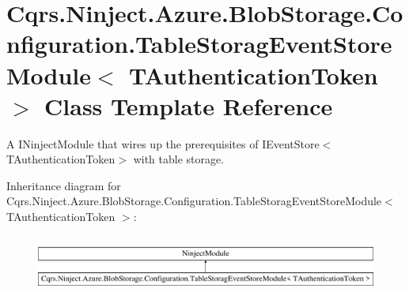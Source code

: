 \hypertarget{classCqrs_1_1Ninject_1_1Azure_1_1BlobStorage_1_1Configuration_1_1TableStoragEventStoreModule}{}\section{Cqrs.\+Ninject.\+Azure.\+Blob\+Storage.\+Configuration.\+Table\+Storag\+Event\+Store\+Module$<$ T\+Authentication\+Token $>$ Class Template Reference}
\label{classCqrs_1_1Ninject_1_1Azure_1_1BlobStorage_1_1Configuration_1_1TableStoragEventStoreModule}


A I\+Ninject\+Module that wires up the prerequisites of I\+Event\+Store$<$\+T\+Authentication\+Token$>$ with table storage.  


Inheritance diagram for Cqrs.\+Ninject.\+Azure.\+Blob\+Storage.\+Configuration.\+Table\+Storag\+Event\+Store\+Module$<$ T\+Authentication\+Token $>$\+:\begin{figure}[H]
\begin{center}
\leavevmode
\includegraphics[height=1.863561cm]{classCqrs_1_1Ninject_1_1Azure_1_1BlobStorage_1_1Configuration_1_1TableStoragEventStoreModule}
\end{center}
\end{figure}
